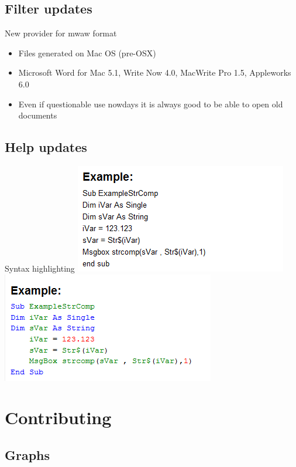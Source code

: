 \documentclass{beamer}
\begin{document}
\subsection{Filter updates}

\begin{frame}[t]{New provider for mwaw format}
	\begin{itemize}
	\item Files generated on Mac OS (pre-OSX)
	\item Microsoft Word for Mac 5.1, Write Now 4.0, MacWrite Pro 1.5, Appleworks 6.0
	\item Even if questionable use nowdays it is always good to be able to open old documents
	\end{itemize}
\end{frame}

\subsection{Help updates}

\begin{frame}{Syntax highlighting}
	\includegraphics[width= 0.5\linewidth]{syntax36-help.png}
	\includegraphics[width= 0.5\linewidth]{syntax41-help.png}
\end{frame}

\section{Contributing}

\subsection{Graphs}
\end{document}
